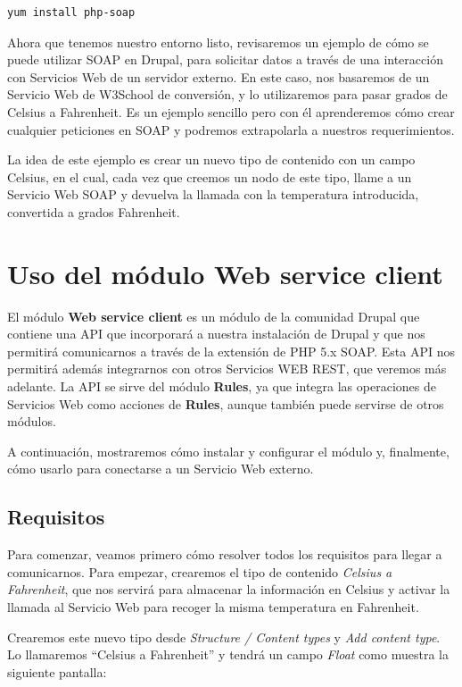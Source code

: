 \begin{verbatim}
yum install php-soap
\end{verbatim}

Ahora que tenemos nuestro entorno listo, revisaremos un ejemplo de cómo se puede utilizar SOAP en Drupal, 
para solicitar datos a través de una interacción con Servicios Web de un servidor externo. En este caso, 
nos basaremos de un Servicio Web de W3School de conversión, y lo utilizaremos para pasar grados de Celsius a 
Fahrenheit. Es un ejemplo sencillo pero con él aprenderemos cómo crear cualquier peticiones en SOAP y 
podremos extrapolarla a nuestros requerimientos.

La idea de este ejemplo es crear un nuevo tipo de contenido con un campo Celsius, en el cual, cada vez que 
creemos un nodo de este tipo, llame a un Servicio Web SOAP y devuelva la llamada con la temperatura introducida, 
convertida a grados Fahrenheit.

\section{Uso del módulo Web service client}

El módulo \textbf{Web service client} es un módulo de la comunidad Drupal que contiene una API que incorporará 
a nuestra instalación de Drupal y que nos permitirá comunicarnos a través de la extensión de PHP 5.x SOAP. Esta 
API nos permitirá además integrarnos con otros Servicios WEB REST, que veremos más adelante. La API se sirve 
del módulo \textbf{Rules}, ya que integra las operaciones de Servicios Web como acciones de \textbf{Rules},  
aunque también puede servirse de otros módulos. 
  
A continuación, mostraremos cómo instalar y configurar el módulo y, finalmente, cómo usarlo para conectarse a 
un Servicio Web externo.

\subsection{Requisitos}

Para comenzar, veamos primero cómo resolver todos los requisitos para llegar a comunicarnos. Para empezar, crearemos 
el tipo de contenido \textit{Celsius a Fahrenheit}, que nos servirá para almacenar la información en Celsius y 
activar la llamada al Servicio Web para recoger la misma temperatura en Fahrenheit.

Crearemos este nuevo tipo desde \textit{Structure / Content types} y \textit{Add content type}. Lo llamaremos 
``Celsius a Fahrenheit'' y tendrá un campo \textit{Float} como muestra la siguiente pantalla:

